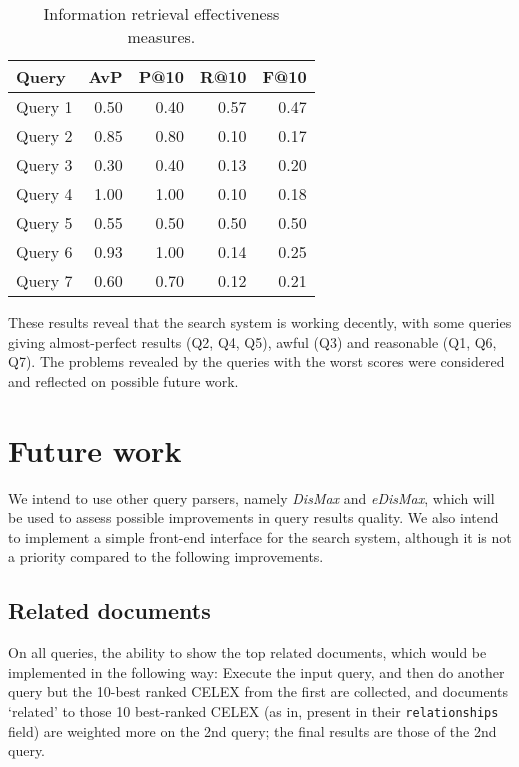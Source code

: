 \documentclass[sigconf, authorversion]{acmart}
\begin{document}
\begin{table}[ht]
    \centering
    \caption{Information retrieval effectiveness measures.} \label{tab:ir-quality}
    \begin{tabular}{@{}l|r r r r@{}}
        \textbf{Query}   & AvP  & P@10 & R@10 & F@10 \\ \hline
        Query 1          & 0.50 & 0.40 & 0.57 & 0.47 \\
        Query 2          & 0.85 & 0.80 & 0.10 & 0.17 \\
        Query 3          & 0.30 & 0.40 & 0.13 & 0.20 \\
        Query 4          & 1.00 & 1.00 & 0.10 & 0.18 \\
        Query 5          & 0.55 & 0.50 & 0.50 & 0.50 \\
        Query 6          & 0.93 & 1.00 & 0.14 & 0.25 \\
        Query 7          & 0.60 & 0.70 & 0.12 & 0.21 \\
    \end{tabular}
\end{table}

These results reveal that the search system is working decently, with some queries giving almost-perfect results (Q2, Q4, Q5), awful (Q3) and reasonable (Q1, Q6, Q7). The problems revealed by the queries with the worst scores were considered and reflected on possible future work.

\section{Future work}

We intend to use other query parsers, namely \textit{DisMax} and \textit{eDisMax}, which will be used to assess possible improvements in query results quality.
We also intend to implement a simple front-end interface for the search system, although it is not a priority compared to the following improvements.

\subsection{Related documents}
On all queries, the ability to show the top related documents, which would be implemented in the following way: Execute the input query, and then do another query but the 10-best ranked CELEX from the first are collected, and documents `related' to those 10 best-ranked CELEX (as in, present in their \texttt{relationships} field) are weighted more on the 2nd query; the final results are those of the 2nd query. 
    
\end{document}
